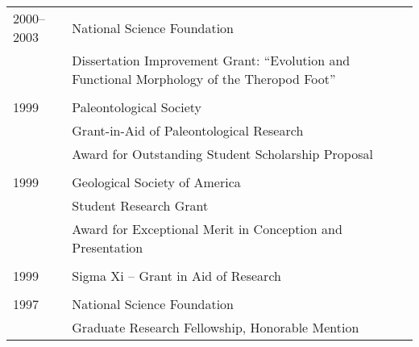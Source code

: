 \begin{longtable}{@{}lX@{}}
    2000--2003 & National Science Foundation\\
    & Dissertation Improvement Grant: ``Evolution and Functional Morphology of the Theropod Foot''\\
    \\
    1999 & Paleontological Society\\
    & Grant-in-Aid of Paleontological Research\\
    & Award for Outstanding Student Scholarship Proposal\\
    \\
    1999 & Geological Society of America\\
    & Student Research Grant\\
    & Award for Exceptional Merit in Conception and Presentation\\
    \\
    1999 & Sigma Xi -- Grant in Aid of Research\\
    \\
    1997 & National Science Foundation\\
    & Graduate Research Fellowship, Honorable Mention\\
\end{longtable}
